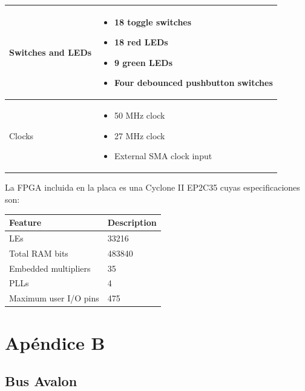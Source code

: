 \begin{center}
\begin{longtable}{|l|p{4.75in}|}
		Switches and LEDs & \begin{itemize}
					\item 18 toggle switches
    					\item 18 red LEDs
   					\item 9 green LEDs
   		 			\item Four debounced pushbutton switches
   				     \end{itemize} \\ \hline
		Clocks & \begin{itemize}
					\item 50 MHz clock
    					\item 27 MHz clock
   					\item External SMA clock input
   			 \end{itemize}	 \\ \hline
	\end{longtable} 
\end{center}

La FPGA incluida en la placa es una Cyclone II EP2C35 cuyas especificaciones son:

\begin{center}
	\begin{longtable}{|l|p{1.75in}|} \hline
		\textbf{Feature} & \textbf{Description} \\ \hline
		LEs & 33216 \\ \hline
		Total RAM bits & 483840 \\ \hline
		Embedded multipliers & 35 \\ \hline
		PLLs & 4 \\ \hline
		Maximum user I/O pins & 475 \\ \hline
	\end{longtable}
\end{center}

\chapter{Apéndice B}

\section*{Bus Avalon}

